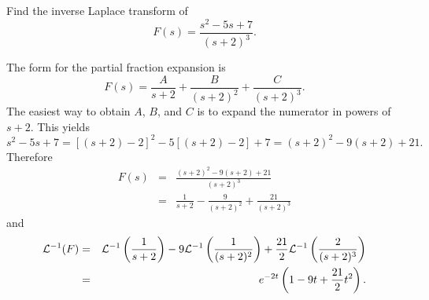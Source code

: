 \documentclass{ximera}
\begin{document}
\begin{example}\label{example:8.2.7} Find the inverse Laplace transform
of
$$
F(s)=\frac{s^2-5s+7}{(s+2)^3}.
$$

\begin{explanation}
The form for the partial fraction expansion  is
$$
F(s)=\frac{A}{s+2}+\frac{B}{(s+2)^2}+\frac{C}{(s+2)^3}.
$$
The easiest way to obtain $A$, $B$, and $C$ is to expand the numerator
in powers of $s+2$. This yields
$$
s^2-5s+7=[(s+2)-2]^2-5[(s+2)-2]+7=(s+2)^2-9(s+2)+21.
$$
Therefore
\begin{eqnarray*}
F(s)&=&\frac{(s+2)^2-9(s+2)+21}{(s+2)^3}\\[10pt]
&=&\frac{1}{s+2}-\frac{9}{(s+2)^2}+\frac{21}{(s+2)^3}
\end{eqnarray*}
and
\begin{eqnarray*}
{\cal L}^{-1}(F)&=&
{\cal L}^{-1}\left(\frac{1}{s+2}\right)-9{\cal
L}^{-1}\left(\frac{1}{(s+2)^2}\right)+\frac{21}{2}{\cal
L}^{-1}\left(\frac{2}{(s+2)^3}\right)\\&=&
e^{-2t}\left(1-9t+\frac{21}{2}t^2\right).
\end{eqnarray*}
\end{explanation}
\end{example}
\end{document}
